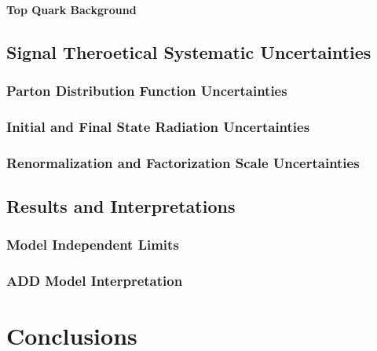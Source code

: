 \documentclass[10pt,twoside,cucitura,classica,english,openany]{toptesi}
\begin{document}


\subsubsection{Top Quark Background}
\label{sec:top-quark-background}



\section{Signal Theroetical Systematic Uncertainties}
\label{sec:ther-syst-uncert}



\subsection{Parton Distribution Function Uncertainties}
\label{sec:pdf-uncertainties}



\subsection{Initial and Final State Radiation Uncertainties}
\label{sec:tune-uncertainties}



\subsection{Renormalization and Factorization Scale Uncertainties}
\label{sec:renorm-fact-scale}



\section{Results and Interpretations}
\label{sec:results-interpr}



\subsection{Model Independent Limits}
\label{sec:model-indep-limits-1}



\subsection{ADD Model Interpretation}
\label{sec:add-model-interpr}



\chapter{Conclusions}
\label{cha:conclusions}



\printglossaries

 \printbibliography
\end{document}
